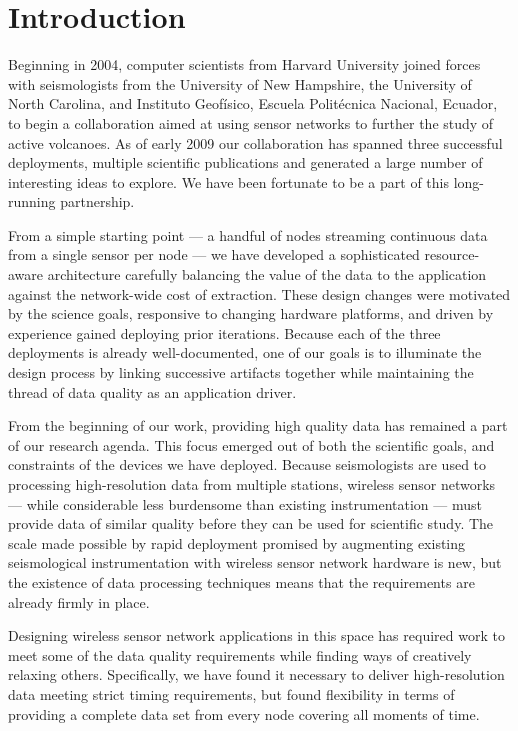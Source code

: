 \chapter{Introduction}
\label{chap-introduction}

Beginning in 2004, computer scientists from Harvard University joined forces
with seismologists from the University of New Hampshire, the University of
North Carolina, and Instituto Geof\'{i}sico, Escuela Polit\'{e}cnica Nacional,
Ecuador, to begin a collaboration aimed at using sensor networks to further the
study of active volcanoes. As of early 2009 our collaboration has spanned
three successful deployments, multiple scientific publications and generated a
large number of interesting ideas to explore.  We have been fortunate to be a
part of this long-running partnership.

From a simple starting point --- a handful of nodes streaming continuous data
from a single sensor per node --- we have developed a sophisticated
resource-aware architecture carefully balancing the value of the data to the
application against the network-wide cost of extraction. These design changes
were motivated by the science goals, responsive to changing hardware
platforms, and driven by experience gained deploying prior iterations.
Because each of the three deployments is already well-documented, one of
our goals is to illuminate the design process by linking successive artifacts
together while maintaining the thread of data quality as an application
driver.

From the beginning of our work, providing high quality data has remained a
part of our research agenda. This focus emerged out of both the scientific
goals, and constraints of the devices we have deployed. Because seismologists
are used to processing high-resolution data from multiple stations, wireless
sensor networks --- while considerable less burdensome than existing
instrumentation --- must provide data of similar quality before they can be
used for scientific study.  The scale made possible by rapid deployment
promised by augmenting existing seismological instrumentation with wireless
sensor network hardware is new, but the existence of data processing
techniques means that the requirements are already firmly in place.

Designing wireless sensor network applications in this space has required work
to meet some of the data quality requirements while finding ways of creatively
relaxing others.  Specifically, we have found it necessary to deliver
high-resolution data meeting strict timing requirements, but found flexibility
in terms of providing a complete data set from every node covering all moments
of time.

